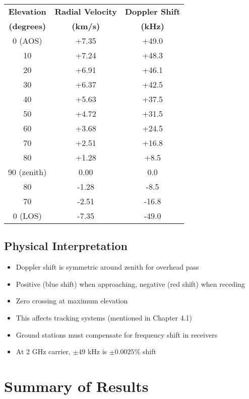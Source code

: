 \documentclass[11pt,letterpaper]{article}
\begin{document}
\begin{center}
\begin{tabular}{@{}ccc@{}}
\toprule
\textbf{Elevation} & \textbf{Radial Velocity} & \textbf{Doppler Shift} \\
\textbf{(degrees)} & \textbf{(km/s)} & \textbf{(kHz)} \\
\midrule
0  (AOS) & +7.35 & +49.0 \\
10  & +7.24 & +48.3 \\
20  & +6.91 & +46.1 \\
30  & +6.37 & +42.5 \\
40  & +5.63 & +37.5 \\
50  & +4.72 & +31.5 \\
60  & +3.68 & +24.5 \\
70  & +2.51 & +16.8 \\
80  & +1.28 & +8.5 \\
90  (zenith) & 0.00 & 0.0 \\
80  & -1.28 & -8.5 \\
70  & -2.51 & -16.8 \\
0  (LOS) & -7.35 & -49.0 \\
\bottomrule
\end{tabular}
\end{center}

\subsection{Physical Interpretation}
\begin{itemize}
    \item Doppler shift is symmetric around zenith for overhead pass
    \item Positive (blue shift) when approaching, negative (red shift) when receding
    \item Zero crossing at maximum elevation
    \item This affects tracking systems (mentioned in Chapter 4.1)
    \item Ground stations must compensate for frequency shift in receivers
    \item At 2 GHz carrier, $\pm 49$ kHz is $\pm 0.0025\%$ shift
\end{itemize}

\section{Summary of Results}
\end{document}
